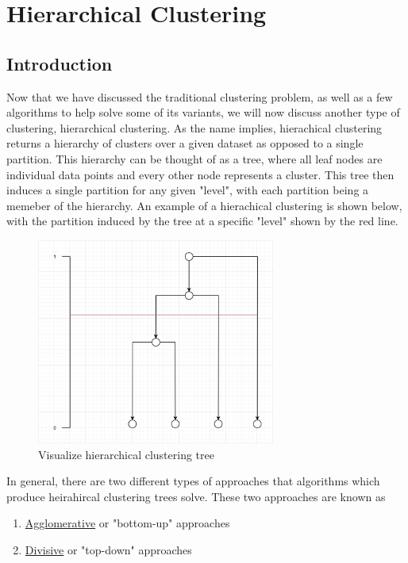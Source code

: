 


\section{Hierarchical Clustering}

\subsection{Introduction}
Now that we have discussed the traditional clustering problem, as well as a few algorithms to help solve some of its variants, we will now discuss another type of clustering, hierarchical clustering.  As the name implies, hierachical clustering returns a hierarchy of clusters over a given dataset as opposed to a single partition.  This hierarchy can be thought of as a tree, where all leaf nodes are individual data points and every other node represents a cluster.  This tree then induces a single partition for any given "level", with each partition being a memeber of the hierarchy.   An example of a hierachical clustering is shown below, with the partition induced by the tree at a specific "level" shown by the red line.

\begin{figure}[h]
\centering
\includegraphics[width=0.7\textwidth]{chapter_1/files/hier_tree_example}
\caption{Visualize hierarchical clustering tree}
\end{figure}

In general, there are two different types of approaches that algorithms which produce heirahircal clustering trees solve.  These two approaches are known as 
\begin{enumerate}
\item \underline{Agglomerative} or "bottom-up" approaches
\item \underline{Divisive} or "top-down" approaches
\end{enumerate}


